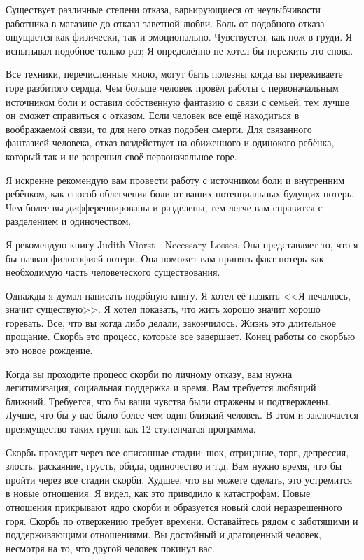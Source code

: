 \documentclass[10pt, fleqn]{article}
\begin{document}
Существует различные степени отказа, варьирующиеся от неулыбчивости работника в магазине до отказа заветной любви. Боль от подобного отказа ощущается как физически, так и эмоционально. Чувствуется, как нож в груди. Я испытывал подобное только раз; Я определённо не хотел бы пережить это снова.

Все техники, перечисленные мною, могут быть полезны когда вы переживаете горе разбитого сердца. Чем больше человек провёл работы с первоначальным источником боли и оставил собственную фантазию о связи с семьей, тем лучше он сможет справиться с отказом. Если человек все ещё находиться в воображаемой связи, то для него отказ подобен смерти. Для связанного фантазией человека, отказ воздействует на обиженного и одинокого ребёнка, который так и не разрешил своё первоначальное горе.

Я искренне рекомендую вам провести работу с источником боли и внутренним ребёнком, как способ облегчения боли от ваших потенциальных будущих потерь. Чем более вы дифференцированы и разделены, тем легче вам справится с разделением и одиночеством.

Я рекомендую книгу Judith Viorst - Necessary Losses. Она представляет то, что я бы назвал философией потери. Она поможет вам принять факт потерь как необходимую часть человеческого существования.

Однажды я думал написать подобную книгу. Я хотел её назвать <<Я печалюсь, значит существую>>. Я хотел показать, что жить хорошо значит хорошо горевать. Все, что вы когда либо делали, закончилось. Жизнь это длительное прощание. Скорбь это процесс, которые все завершает. Конец работы со скорбью это новое рождение.

Когда вы проходите процесс скорби по личному отказу, вам нужна легитимизация, социальная поддержка и время. Вам требуется любящий ближний. Требуется, что бы ваши чувства были отражены и подтверждены. Лучше, что бы у вас было более чем один близкий человек. В этом и заключается преимущество таких групп как 12-ступенчатая программа.

Скорбь проходит через все описанные стадии: шок, отрицание, торг, депрессия, злость, раскаяние, грусть, обида, одиночество и т.д. Вам нужно время, что бы пройти через все стадии скорби. Худшее, что вы можете сделать, это устремится в новые отношения. Я видел, как это приводило к катастрофам. Новые отношения прикрывают ядро скорби и образуется новый слой неразрешенного горя. Скорбь по отвержению требует времени. Оставайтесь рядом с заботящими и поддерживающими отношениями. Вы достойный и драгоценный человек, несмотря на то, что другой человек покинул вас.
\end{document}

